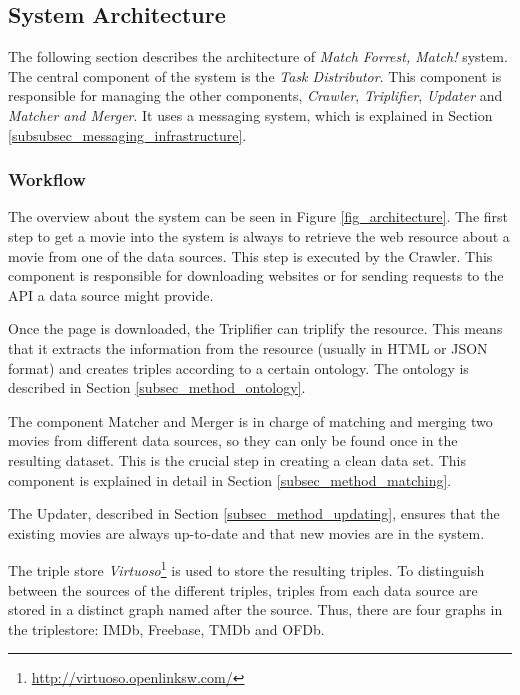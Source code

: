 \subsection{System Architecture}
\label{subsec_method_architecture}

The following section describes the architecture of \emph{Match Forrest, Match!} system.
The central component of the system is the \textit{Task Distributor}.
This component is responsible for managing the other components, \textit{Crawler}, \textit{Triplifier}, \textit{Updater} and \textit{Matcher and Merger}.
It uses a messaging system, which is explained in Section \ref{subsubsec_messaging_infrastructure}.

\subsubsection{Workflow}
\label{subsubsec_workflow}

The overview about the system can be seen in Figure \ref{fig_architecture}.
The first step to get a movie into the system is always to retrieve the web resource about a movie from one of the data sources.
This step is executed by the Crawler.
This component is responsible for downloading websites or for sending requests to the API a data source might provide.

Once the page is downloaded, the Triplifier can triplify the resource.
This means that it extracts the information from the resource (usually in HTML or JSON format) and creates triples according to a certain ontology.
The ontology is described in Section \ref{subsec_method_ontology}.

The component Matcher and Merger is in charge of matching and merging two movies from different data sources, so they can only be found once in the resulting dataset.
This is the crucial step in creating a clean data set.
This component is explained in detail in Section \ref{subsec_method_matching}.

The Updater, described in Section \ref{subsec_method_updating}, ensures that the existing movies are always up-to-date and that new movies are in the system.

The triple store \emph{Virtuoso}\footnote{\url{http://virtuoso.openlinksw.com/}} is used to store the resulting triples.
To distinguish between the sources of the different triples, triples from each data source are stored in a distinct graph named after the source.
Thus, there are four graphs in the triplestore: IMDb, Freebase, TMDb and OFDb.

